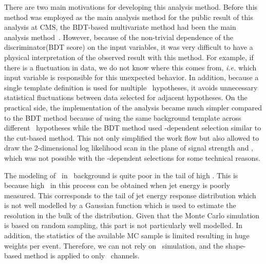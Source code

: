 There are two main motivations for developing this analysis method. 
Before this method was employed as the main analysis method for the 
public result of this analysis at CMS, the BDT-based multivariate method 
had been the main analysis method~\cite{CMS-PAS-HIG-12-038}. However, because of 
the non-trivial dependence of the discriminator(BDT score)
on the input variables, it was very difficult to have a
physical interpretation of the observed result with this method. 
For example, if there is a fluctuation in data, we do not know where this comes from, 
\textit{i.e.} which input variable is responsible for this unexpected 
behavior. In addition, because a single template definition is used for multiple 
\mHi\ hypotheses, it avoids unnecessary statistical fluctuations between data selected 
for adjacent hypotheses.
On the practical side, the implementation of the 
analysis became much simpler compared to the BDT method because of using 
the same background template across different \mHi\ hypotheses
while the BDT method used \mHi-dependent selection similar to the cut-based 
method. This not only simplified the work flow but also allowed to draw 
the 2-dimensional log likelihood scan in the plane of 
signal strength and \mHi, which was not possible with the \mHi-dependent 
selections for some technical reasons. 

The modeling of \met\ in \dyll\ background is quite poor in the tail of high \met. 
This is because high \met\ in this process can be obtained when jet energy is 
poorly measured. This corresponds to the tail of jet energy response distribution 
which is not well modelled by a Gaussian function which is used to estimate the 
resolution in the bulk of the distribution. Given that the Monte Carlo simulation 
is based on random sampling, this part is not particularly well modelled. 
In addition, the statistics of the available MC sample is limited resulting in huge weights
per event. Therefore, we can not rely on \dyll\ simulation, and  
the shape-based method is applied to only \DF\ channels. 

